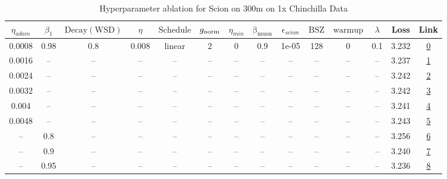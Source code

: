\begin{table}[H]
\centering
\caption{Hyperparameter ablation for Scion on 300m on 1x Chinchilla Data}
\label{tab:ablation_scion_300m_on_1x_chinchilla_data}
\begin{tabular}{cccccccccccccc}
\toprule
$\eta_{adam}$ & $\beta_1$ & $\mathrm{Decay (WSD)}$ & $\eta$ & $\mathrm{Schedule}$ & $g_{\mathrm{norm}}$ & $\eta_{min}$ & $\mathrm{\beta_{muon}}$ & $\epsilon_{scion}$ & $\mathrm{BSZ}$ & $\mathrm{warmup}$ & $\lambda$ & Loss & Link \\
\midrule
0.0008 & 0.98 & 0.8 & 0.008 & linear & 2 & 0 & 0.9 & 1e-05 & 128 & 0 & 0.1 & 3.232 & \href{https://wandb.ai/marin-community/optimizer-scaling/runs/sweep-300m-6B-sciond108279lr0.008-wd0.1-minlr0-warmup0-b10.98-gn-99a9f4}{0} \\
\midrule
0.0016 & -- & -- & -- & -- & -- & -- & -- & -- & -- & -- & -- & 3.237 & \href{https://wandb.ai/marin-community/optimizer-scaling/runs/sweep-300m-6B-scionfa9d01lr0.008-wd0.1-minlr0-warmup0-b10.98-gn2-d33d38}{1} \\
0.0024 & -- & -- & -- & -- & -- & -- & -- & -- & -- & -- & -- & 3.242 & \href{https://wandb.ai/marin-community/optimizer-scaling/runs/sweep-300m-6B-sciond6c4a32lr0.008-wd0.1-minlr0-warmup0-b10.98-gn-c70e3a}{2} \\
0.0032 & -- & -- & -- & -- & -- & -- & -- & -- & -- & -- & -- & 3.242 & \href{https://wandb.ai/marin-community/optimizer-scaling/runs/sweep-300m-6B-sciond4688b4lr0.008-wd0.1-minlr0-warmup0-b10.98-gn-cc3a61}{3} \\
0.004 & -- & -- & -- & -- & -- & -- & -- & -- & -- & -- & -- & 3.241 & \href{https://wandb.ai/marin-community/optimizer-scaling/runs/sweep-300m-6B-sciond8d54b4lr0.008-wd0.1-minlr0-warmup0-b10.98-gn-e2040c}{4} \\
0.0048 & -- & -- & -- & -- & -- & -- & -- & -- & -- & -- & -- & 3.243 & \href{https://wandb.ai/marin-community/optimizer-scaling/runs/sweep-300m-6B-scionda31eablr0.008-wd0.1-minlr0-warmup0-b10.98-gn-ed268b}{5} \\
-- & 0.8 & -- & -- & -- & -- & -- & -- & -- & -- & -- & -- & 3.256 & \href{https://wandb.ai/marin-community/optimizer-scaling/runs/sweep-300m-6B-sciond3c2ebclr0.008-wd0.1-minlr0-warmup0-b10.8-gn2-8c6e43}{6} \\
-- & 0.9 & -- & -- & -- & -- & -- & -- & -- & -- & -- & -- & 3.240 & \href{https://wandb.ai/marin-community/optimizer-scaling/runs/sweep-300m-6B-sciond8d2973lr0.008-wd0.1-minlr0-warmup0-b10.9-gn2-1189a9}{7} \\
-- & 0.95 & -- & -- & -- & -- & -- & -- & -- & -- & -- & -- & 3.236 & \href{https://wandb.ai/marin-community/optimizer-scaling/runs/sweep-300m-6B-sciondd97ff2lr0.008-wd0.1-minlr0-warmup0-b10.95-gn-16dc4b}{8} \\

\end{tabular}
\end{table}
